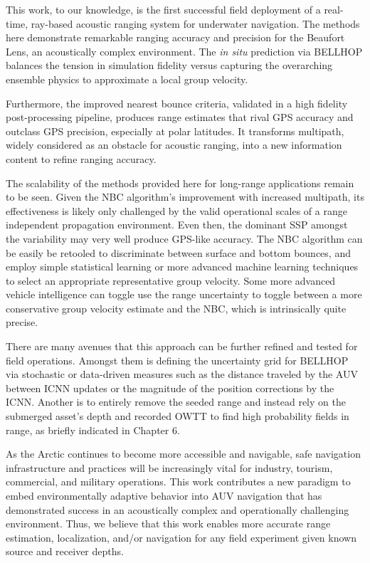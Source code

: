 This work, to our knowledge, is the first successful field deployment of a real-time, ray-based acoustic ranging system for underwater navigation.
The methods here demonstrate remarkable ranging accuracy and precision for the Beaufort Lens, an acoustically complex environment.
The \textit{in situ} prediction via BELLHOP balances the tension in simulation fidelity versus capturing the overarching ensemble physics to approximate a local group velocity.

Furthermore, the improved nearest bounce criteria, validated in a high fidelity post-processing pipeline, produces range estimates that rival GPS accuracy and outclass GPS precision, especially at polar latitudes.
It transforms multipath, widely considered as an obstacle for acoustic ranging, into a new information content to refine ranging accuracy.

The scalability of the methods provided here for long-range applications remain to be seen.
Given the NBC algorithm's improvement with increased multipath, its effectiveness is likely only challenged by the valid operational scales of a range independent propagation environment.
Even then, the dominant SSP amongst the variability may very well produce GPS-like accuracy.
The NBC algorithm can be easily be retooled to discriminate between surface and bottom bounces, and employ simple statistical learning or more advanced machine learning techniques to select an appropriate representative group velocity.
Some more advanced vehicle intelligence can toggle use the range uncertainty to toggle between a more conservative group velocity estimate and the NBC, which is intrinsically quite precise.

There are many avenues that this approach can be further refined and tested for field operations.
Amongst them is defining the uncertainty grid for BELLHOP via stochastic or data-driven measures such as the distance traveled by the AUV between ICNN updates or the magnitude of the position corrections by the ICNN.
Another is to entirely remove the seeded range and instead rely on the submerged asset's depth and recorded OWTT to find high probability fields in range, as briefly indicated in Chapter 6.

As the Arctic continues to become more accessible and navigable, safe navigation infrastructure and practices will be increasingly vital for industry, tourism, commercial, and military operations.
This work contributes a new paradigm to embed environmentally adaptive behavior into AUV navigation that has demonstrated success in an acoustically complex and operationally challenging environment.
Thus, we believe that this work enables more accurate range estimation, localization, and/or navigation for any field experiment given known source and receiver depths.

